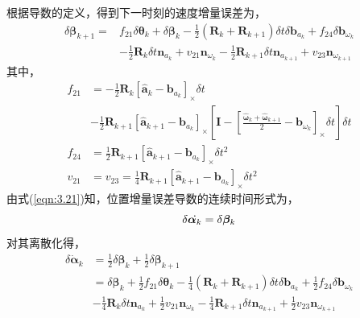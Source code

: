 根据导数的定义，得到下一时刻的速度增量误差为，
\begin{equation}
\label{eqn:3.46}
\begin{aligned}
\delta \bm{\beta}_{k+1}=& f_{21} \delta \bm{\theta}_{k}+\delta \bm{\beta}_{k}-\frac{1}{2}\left( \mathbf{R}_{k}+\mathbf{R}_{k+1}\right) \delta t \delta \mathbf{b}_{a_{k}}+f_{24} \delta \mathbf{b}_{\omega_{k}} \\ 
& -\frac{1}{2} \mathbf{R}_{k} \delta t \mathbf{n}_{a_{k}} +v_{21} \mathbf{n}_{\omega_{k}}-\frac{1}{2} \mathbf{R}_{k+1} \delta t \mathbf{n}_{a_{k+1}}+v_{23} \mathbf{n}_{\omega_{k+1}}
\end{aligned}
\end{equation}
其中，
\begin{equation}
\label{eqn:3.47}
\begin{aligned}
f_{21} &= -\frac{1}{2} \mathbf{R}_{k}\left[\hat{\mathbf{a}}_{k}-\mathbf{b}_{a_{k}}\right]_\times \delta t \\
& -\frac{1}{2} \mathbf{R}_{k+1}\left[\hat{\mathbf{a}}_{k+1}-\mathbf{b}_{a_{k}}\right]_\times\left[\mathbf{I}-\left[\frac{\hat{\bm{\omega}}_{k}+\hat{\bm{\omega}}_{k+1}}{2}-\mathbf{b}_{\omega_{k}}\right]_\times \delta t\right] \delta t \\
f_{24} &= \frac{1}{2} \mathbf{R}_{k+1}\left[\hat{\mathbf{a}}_{k+1}-\mathbf{b}_{a_{k}}\right]_\times \delta t^{2} \\
v_{21} &= v_{23}=\frac{1}{4} \mathbf{R}_{k+1}\left[\hat{\mathbf{a}}_{k+1}-\mathbf{b}_{a_{k}}\right]_\times \delta t^{2}
\end{aligned}
\end{equation}
由式(\ref{eqn:3.21})知，位置增量误差导数的连续时间形式为，
\begin{equation}
\label{eqn:3.48}
\setlength{\abovedisplayskip}{6pt}
\setlength{\belowdisplayskip}{6pt}
\delta \dot{\bm{\alpha}_k}=\delta \bm{\beta}_k
\end{equation}
对其离散化得，
\begin{equation}
\label{eqn:3.49}
\begin{aligned}
\delta \dot{\bm{\alpha}}_{k} &= \frac{1}{2} \delta \bm{\beta}_{k}+\frac{1}{2} \delta \bm{\beta}_{k+1} \\
&=\delta \bm{\beta}_{k}+\frac{1}{2} f_{21} \delta \bm{\theta}_{k}-\frac{1}{4}\left( \mathbf{R}_{k}+\mathbf{R}_{k+1}\right) \delta t \delta \mathbf{b}_{a_{k}}+\frac{1}{2} f_{24} \delta \mathbf{b}_{\omega_{k}} \\ 
& -\frac{1}{4} \mathbf{R}_{k} \delta t \mathbf{n}_{a_{k}} +\frac{1}{2} v_{21} \mathbf{n}_{\omega_{k}}-\frac{1}{4} \mathbf{R}_{k+1} \delta t \mathbf{n}_{a_{k+1}}+\frac{1}{2} v_{23} \mathbf{n}_{\omega_{k+1}}
\end{aligned}
\end{equation}
